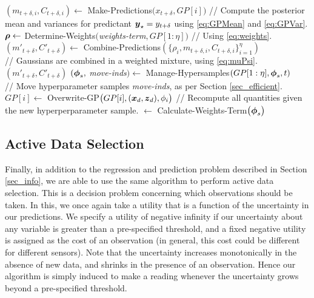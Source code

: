 \documentclass{acmtrans2m}
\newcommand{\cmmnt}{// }
\begin{document}
\begin{algorithm}[htp]
\begin{algorithmic}[1]
\STATE $(m_{t+\delta,i},C_{t+\delta,i}) \leftarrow$ {\sc Make-Predictions}$\bigl(x_{t+\delta},GP[i]\bigr)$ \cmmnt Compute the posterior mean and variances for predictant $\boldsymbol{y}_\star = y_{t+\delta}$ using \eqref{eq:GPMean} and \eqref{eq:GPVar}.
    \ENDFOR
    \STATE $\boldsymbol{\rho} \leftarrow$ {\sc Determine-Weights}$(${\it weights-term}$,GP[1:\eta])$ \cmmnt Using \eqref{eq:weights}.
    \STATE $(m'_{t+\delta},C'_{t+\delta}) \leftarrow$ {\sc Combine-Predictions}$(\{\rho_i,m_{t+\delta,i},C_{t+\delta,i}\}_{i=1}^{\eta})$ \\\cmmnt Gaussians are combined in a weighted mixture, using \eqref{eq:muPsi}.
     $(m'_{t+\delta},C'_{t+\delta})$
\IF{{\sc Is-Time-To-Move}(t) \cmmnt Infrequently true} 
    \STATE $(\boldsymbol{\phi}_s, $ {\it move-inds}$) \leftarrow$ {\sc Manage-Hypersamples}$( 
GP[1:\eta], \boldsymbol{\phi}_s, t)$\\ \cmmnt Move hyperparameter samples {\it move-inds}, as per Section \ref{sec_efficient}.
\STATE $GP[i] \leftarrow$ {\sc Overwrite-GP}$\bigl(GP[i], (\boldsymbol{x}_d, \boldsymbol{z}_d), \phi_i\bigr)$ \cmmnt Recompute all quantities given the new hyperperparameter sample.
\ENDFOR
{} $ \leftarrow$ {\sc Calculate-Weights-Term}$\bigl(\boldsymbol{\phi}_s\bigr)$
\ENDIF
    \ENDFOR
  \end{algorithmic}
  \label{alg:track}
\end{algorithm}

\subsection{Active Data Selection}

\noindent Finally, in addition to the regression and prediction problem described in Section \ref{sec_info}, we are able to use the same algorithm to perform active data selection. This is a decision problem concerning which observations should be taken. In this, we once again take a utility that is a function of the uncertainty in our predictions. We specify a utility of negative infinity if our uncertainty about any variable is greater than a pre-specified threshold, and a fixed negative utility is assigned as the cost of an observation (in general, this cost could be different for different sensors). Note that the uncertainty increases monotonically in the absence of new data, and shrinks in the presence of an observation. Hence our algorithm is simply induced to make a reading whenever the uncertainty grows beyond a pre-specified threshold. 
\end{document}
